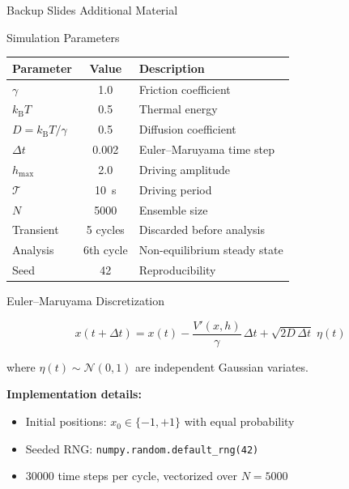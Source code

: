 \documentclass[aspectratio=169,11pt]{beamer}
\newcommand{\kB}{k_{\mathrm{B}}}
\begin{document}

\appendix

\begin{frame}{Backup Slides}
\centering
{\Large Additional Material}
\end{frame}


\begin{frame}{Simulation Parameters}

\centering
\begin{tabular}{lcl}
\toprule
\textbf{Parameter} & \textbf{Value} & \textbf{Description} \\
\midrule
$\gamma$ & 1.0 & Friction coefficient \\
$\kB T$ & 0.5 & Thermal energy \\
$D = \kB T/\gamma$ & 0.5 & Diffusion coefficient \\
$\Delta t$ & 0.002 & Euler--Maruyama time step \\
$h_{\max}$ & 2.0 & Driving amplitude \\
$\mathcal{T}$ & \SI{10}{s} & Driving period \\
$N$ & 5000 & Ensemble size \\
Transient & 5 cycles & Discarded before analysis \\
Analysis & 6th cycle & Non-equilibrium steady state \\
Seed & 42 & Reproducibility \\
\bottomrule
\end{tabular}

\end{frame}


\begin{frame}{Euler--Maruyama Discretization}

\begin{equation*}
    x(t+\Delta t) = x(t) - \frac{V'(x,h)}{\gamma}\,\Delta t + \sqrt{2D\,\Delta t}\;\eta(t)
\end{equation*}

where $\eta(t) \sim \mathcal{N}(0,1)$ are independent Gaussian variates.

\vspace{0.5em}
\textbf{Implementation details:}
\begin{itemize}
    \item Initial positions: $x_0 \in \{-1, +1\}$ with equal probability
    \item Seeded RNG: \texttt{numpy.random.default\_rng(42)}
    \item \num{30000} time steps per cycle, vectorized over $N = \num{5000}$
\end{itemize}

\end{frame}
\end{document}

